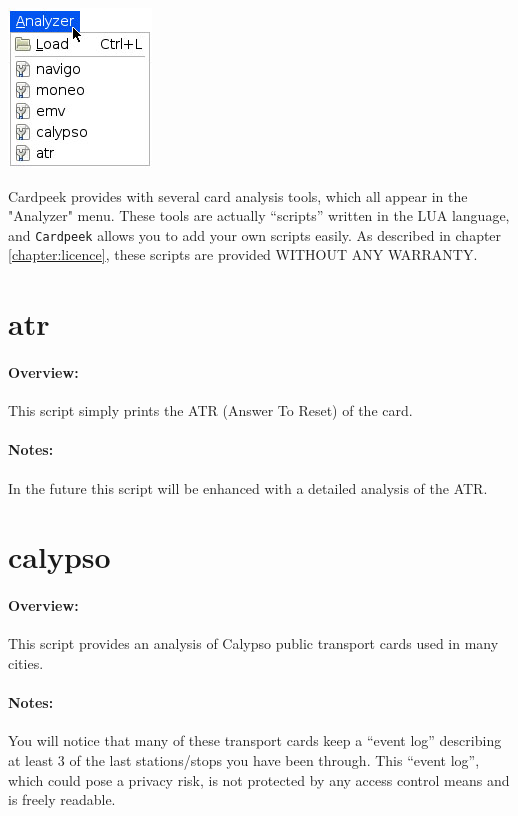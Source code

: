 \documentclass[11pt]{report}
\begin{document}
\begin{center}
\includegraphics[width=.25\textwidth]{graphics/sample-menu-analyzer.jpg}
\end{center}

Cardpeek provides with several card analysis tools, which all appear in the "Analyzer" menu. 
These tools are actually ``scripts'' written in the LUA language, and \texttt{Cardpeek} allows you to add your own scripts easily.
As described in chapter \ref{chapter:licence}, these scripts are provided WITHOUT ANY WARRANTY.

\section{atr}

\paragraph{Overview:}
This script simply prints the ATR (Answer To Reset) of the card.

\paragraph{Notes:}
In the future this script will be enhanced with a detailed analysis of the ATR.

\section{calypso}

\paragraph{Overview:}
This script provides an analysis of Calypso public transport cards used in many cities.

\paragraph{Notes:}
You will notice that many of these transport cards keep a ``event log'' describing at least 3 of the last stations/stops you have been through.
This ``event log'', which could pose a privacy risk, is not protected by any access control means and is freely readable.
\end{document}
